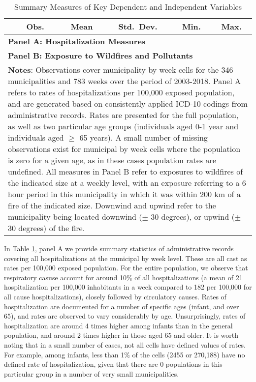 \documentclass[11pt]{article}
\begin{document}
\begin{spacing}{1.3}
\begin{table}[htpb!]
    \centering
    \caption{Summary Measures of Key Dependent and Independent Variables}
    \label{tab:sumstats}
    \begin{tabular}{lccccc} \toprule
    & Obs.\ & Mean & Std.\ Dev. & Min. & Max. \\ \midrule
    \multicolumn{6}{l}{\textbf{Panel A: Hospitalization Measures}}\\
    
    \multicolumn{6}{l}{\textbf{Panel B: Exposure to Wildfires and Pollutants}} \\
     
     
     \midrule
    \multicolumn{6}{p{16.4cm}}{\footnotesize \textbf{Notes}: Observations cover municipality by week cells for the 346 municipalities and 783 weeks over the period of 2003-2018.
    Panel A refers to rates of hospitalizations per 100,000 exposed population, and are generated based on consistently applied ICD-10 codings from administrative records.  Rates are presented for the full population, as well as two particular age groups (individuals aged 0-1 year and individuals aged $\geq$ 65 years). A small number of missing observations exist for municipal by week cells where the population is zero for a given age, as in these cases population rates are undefined.
    All measures in Panel B refer to exposures to wildfires of the indicated size at a weekly level, with an exposure referring to a 6 hour period in this municipality in which it was within 200 km of a fire of the indicated size.  Downwind and upwind refer to the municipality being located downwind ($\pm$ 30 degrees), or upwind ($\pm$ 30 degrees) of the fire.  }\\  \bottomrule
    \end{tabular}
\end{table}

In Table \ref{tab:sumstats}, panel A we provide summary statistics of administrative records covering all hospitalizations at the municipal by week level. These are all cast as rates per 100,000 exposed population.  For the entire population, we observe that respiratory casuse account for around 10\% of all hospitalizations (a mean of 21 hospitalization per 100,000 inhabitants in a week compared to 182 per 100,000 for all cause hospitalizations), closely followed by circulatory causes.  Rates of hospitalization are documented for a number of specific ages (infant, and over 65), and rates are observed to vary considerably by age.  Unsurprisingly, rates of hospitalization are around 4 times higher among infants than in the general population, and around 2 times higher in those aged 65 and older.  It is worth noting that in a small number of cases, not all cells have defined values of rates.  For example, among infants, less than 1\% of the cells (2455 or 270,188) have no defined rate of hospitalization, given that there are 0 populations in this particular group in a number of very small municipalities.  %


\end{spacing}
\end{document}
